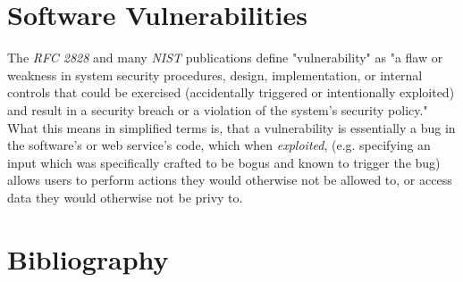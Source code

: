 \documentclass[a4paper,12pt]{article}
\begin{document}
\newpage
\section{Software Vulnerabilities}
	
	The \textit{RFC 2828} and many \textit{NIST} publications define "vulnerability" as "a flaw or weakness in system security procedures, design, implementation, or internal controls that could be exercised (accidentally triggered or intentionally exploited) and result in a security breach or a violation of the system's security policy."\cite{rfc2828,nist80030} What this means in simplified terms is, that a vulnerability is essentially a bug in the software's or web service's code, which when \textit{exploited}, (e.g. specifying an input which was specifically crafted to be bogus and known to trigger the bug) allows users to perform actions they would otherwise not be allowed to, or access data they would otherwise not be privy to.
	
\newpage
\section{Bibliography}
\end{document}
